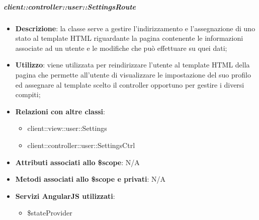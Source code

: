 		\subparagraph{client::controller::user::SettingsRoute} %
		\label{subp:bdsm_app_client_controller_user_settingsroute}
			\begin{itemize}
				\item \textbf{Descrizione}: la classe serve a gestire l'indirizzamento e l'assegnazione di uno stato al template HTML riguardante la pagina contenente le informazioni associate ad un utente e le modifiche che può effettuare su quei dati;
				\item \textbf{Utilizzo}: viene utilizzata per reindirizzare l'utente al template HTML della pagina che permette all'utente di visualizzare le impostazione del suo profilo ed assegnare al template scelto il controller opportuno per gestire i diversi compiti;
				\item \textbf{Relazioni con altre classi}:
					\begin{itemize}
						\item client::view::user::Settings
						\item client::controller::user::SettingsCtrl
					\end{itemize}
				\item \textbf{Attributi associati allo \$scope}: N/A
				\item \textbf{Metodi associati allo \$scope e privati}: N/A
				\item \textbf{Servizi AngularJS utilizzati}:
					\begin{itemize}
						\item \$stateProvider
					\end{itemize}
			\end{itemize}

